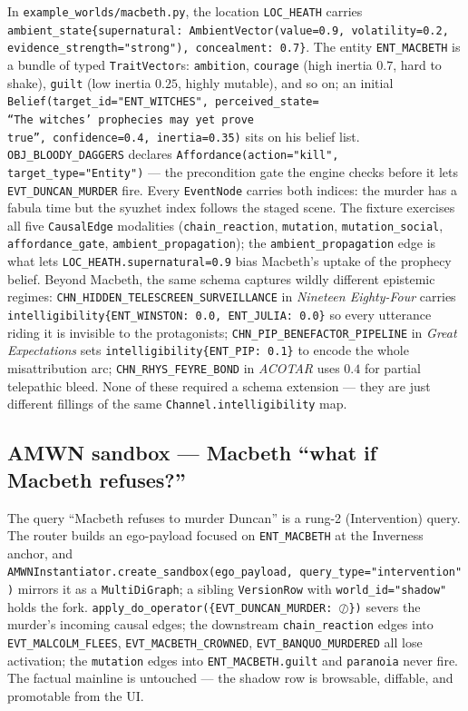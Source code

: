 \documentclass[11pt]{article}
\begin{document}
In \texttt{example\_worlds/macbeth.py}, the location
\texttt{LOC\_HEATH} carries
\texttt{ambient\_state\{supernatural: AmbientVector(value=0.9,
volatility=0.2, evidence\_strength="strong"), concealment: 0.7\}}.
The entity \texttt{ENT\_MACBETH} is a bundle of typed
\texttt{TraitVector}s: \texttt{ambition}, \texttt{courage} (high
inertia $0.7$, hard to shake), \texttt{guilt} (low inertia $0.25$,
highly mutable), and so on; an initial
\texttt{Belief(target\_id="ENT\_WITCHES",\ perceived\_state=\\
``The witches' prophecies may yet prove true'',\ confidence=0.4,\ inertia=0.35)}
sits on his belief list. \texttt{OBJ\_BLOODY\_DAGGERS} declares
\texttt{Affordance(action="kill", target\_type="Entity")} ---
the precondition gate the engine checks before it lets
\texttt{EVT\_DUNCAN\_MURDER} fire. Every \texttt{EventNode} carries
both indices: the murder has a fabula time but the syuzhet index
follows the staged scene. The fixture exercises all five
\texttt{CausalEdge} modalities (\texttt{chain\_reaction},
\texttt{mutation}, \texttt{mutation\_social},
\texttt{affordance\_gate}, \texttt{ambient\_propagation}); the
\texttt{ambient\_propagation} edge is what lets
\texttt{LOC\_HEATH.supernatural=0.9} bias Macbeth's uptake of the
prophecy belief. Beyond Macbeth, the same schema captures wildly
different epistemic regimes: \texttt{CHN\_HIDDEN\_TELESCREEN\_SURVEILLANCE}
in \emph{Nineteen Eighty-Four} carries \texttt{intelligibility\{ENT\_WINSTON:
0.0, ENT\_JULIA: 0.0\}} so every utterance riding it is invisible to
the protagonists; \texttt{CHN\_PIP\_BENEFACTOR\_PIPELINE} in \emph{Great
Expectations} sets \texttt{intelligibility\{ENT\_PIP: 0.1\}} to encode
the whole misattribution arc; \texttt{CHN\_RHYS\_FEYRE\_BOND} in
\emph{ACOTAR} uses $0.4$ for partial telepathic bleed. None of these
required a schema extension --- they are just different fillings of
the same \texttt{Channel.intelligibility} map.

\subsection{AMWN sandbox --- Macbeth ``what if Macbeth refuses?''}
\label{app:ex-amwn}

The query ``Macbeth refuses to murder Duncan'' is a rung-2
(Intervention) query. The router builds an ego-payload focused on
\texttt{ENT\_MACBETH} at the Inverness anchor, and
\texttt{AMWNInstantiator.create\_sandbox(ego\_payload,\ query\_type="intervention")}
mirrors it as a \texttt{MultiDiGraph}; a sibling
\texttt{VersionRow} with \texttt{world\_id="shadow"} holds the fork.
\texttt{apply\_do\_operator(\{EVT\_DUNCAN\_MURDER: $\oslash$\})}
severs the murder's incoming causal edges; the downstream
\texttt{chain\_reaction} edges into \texttt{EVT\_MALCOLM\_FLEES},
\texttt{EVT\_MACBETH\_CROWNED}, \texttt{EVT\_BANQUO\_MURDERED} all
lose activation; the \texttt{mutation} edges into
\texttt{ENT\_MACBETH.guilt} and \texttt{paranoia} never fire. The
factual mainline is untouched --- the shadow row is browsable,
diffable, and promotable from the UI.
\end{document}
